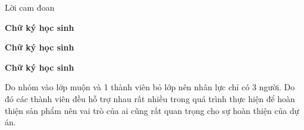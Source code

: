 \documentclass{uetgraduation}
\begin{document}
\begin{contentlisting}
\begin{contentlistingsection}{Lời cam đoan}
        \vspace{2cm}
        \begin{center}
            \begin{minipage}[t]{0.3\textwidth}
                \centering
                \textbf{Chữ ký học sinh}
            \end{minipage}\hfill
            \begin{minipage}[t]{0.3\textwidth}
                \centering
                \textbf{Chữ ký học sinh}
            \end{minipage}\hfill
            \begin{minipage}[t]{0.3\textwidth}
                \centering
                \textbf{Chữ ký học sinh}
            \end{minipage}
        \end{center}
        \vspace{6cm}
        
  Do nhóm vào lớp muộn và 1 thành viên bỏ lớp nên nhân lực chỉ có 3 người. Do đó các thành viên đều hỗ trợ nhau rất nhiều trong quá trình thực hiện để hoàn thiện sản phẩm nên vai trò của ai cũng rất quan trọng cho sự hoàn thiện của dự án.
    \end{contentlistingsection}
    
    
    \tableofcontents

    \newpage


\end{contentlisting}
\end{document}
